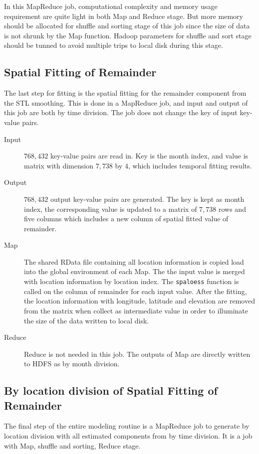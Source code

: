 In this MapReduce job, computational complexity and memory usage requirement are 
quite light in both Map and Reduce stage. But more memory should be allocated for
shuffle and sorting stage of this job since the size of data is not shrunk by
the Map function. Hadoop parameters for shuffle and sort stage should be tunned 
to avoid multiple trips to local disk during this stage. 

\subsection{Spatial Fitting of Remainder}
\label{sec:sparfit}
The last step for fitting is the spatial fitting for the remainder component from
the STL smoothing. This is done in a MapReduce job, and input and output of this
job are both by time division. The job does not change the key of input key-value
pairs.

\begin{description}
\item[Input] $768,432$ key-value pairs are read in. Key is the month index, and 
value is matrix with dimension $7,738$ by $4$, which includes temporal fitting 
results.
\item[Output] $768,432$ output key-value pairs are generated. The key is kept as
month index, the corresponding value is updated to a matrix of $7,738$ rows 
and five columns which includes a new column of spatial fitted value of remainder.
\item[Map] The shared RData file containing all location information is copied
load into the global environment of each Map. The the input value is merged with
location information by location index. The \texttt{spaloess} function is called
on the column of remainder for each input value. After the fitting, the location
information with longitude, latitude and elevation are removed from the matrix
when collect as intermediate value in order to illuminate the size of the data
written to local disk.
\item[Reduce] Reduce is not needed in this job. The outputs of Map are directly
written to HDFS as by month division.
\end{description}

\subsection{By location division of Spatial Fitting of Remainder}
\label{sec:swaptoloc2}
The final step of the entire modeling routine is a MapReduce job to generate by
location division with all estimated components from by time division. It is a
job with Map, shuffle and sorting, Reduce stage.


